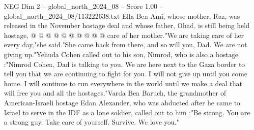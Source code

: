 \begin{textsample}{NEG Dim 2 – global\_north\_2024\_08 – Score 1.00 – global\_north\_2024\_08/113222638.txt}
Ella Ben Ami, whose mother, Raz, was released in the November hostage deal and whose father, Ohad, is still being held hostage, @ @ @ @ @ @ @ @ @ @ care of her mother."We are taking care of her every day,"she said."She came back from there, and so will you, Dad.
We are not giving up."Yehuda Cohen called out to his son, Nimrod, who is also a hostage :"Nimrod Cohen, Dad is talking to you.
We are here next to the Gaza border to tell you that we are continuing to fight for you.
I will not give up until you come home.
I will continue to run everywhere in the world until we make a deal that will free you and all the hostages."Varda Ben Baruch, the grandmother of American-Israeli hostage Edan Alexander, who was abducted after he came to Israel to serve in the IDF as a lone soldier, called out to him :"Be strong.
You are a strong guy.
Take care of yourself.
Survive.
We love you."

\end{textsample}
